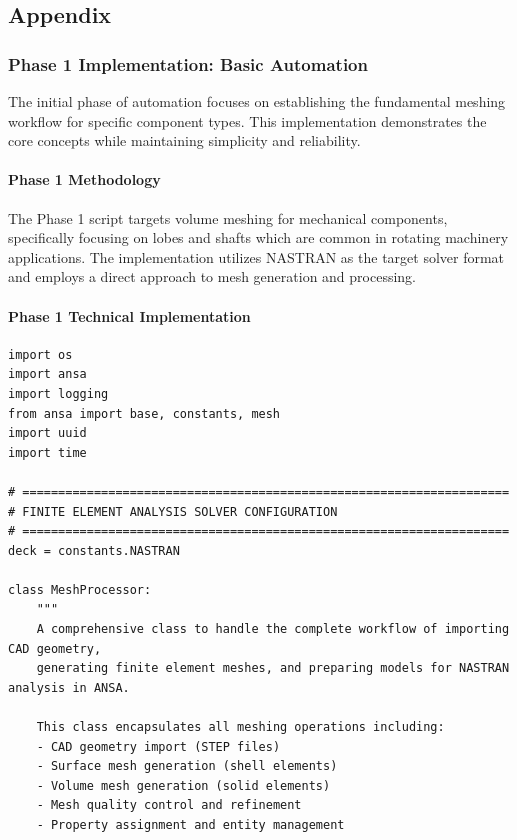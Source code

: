 \documentclass{book}
\begin{document}
\begin{itemize}[leftmargin=*,label=\textbullet]
\begin{itemize}
\newpage
\part{Appendix}
\section{Phase 1 Implementation: Basic Automation}

The initial phase of automation focuses on establishing the fundamental meshing workflow for specific component types. This implementation demonstrates the core concepts while maintaining simplicity and reliability.

\subsection{Phase 1 Methodology}

The Phase 1 script targets volume meshing for mechanical components, specifically focusing on lobes and shafts which are common in rotating machinery applications. The implementation utilizes NASTRAN as the target solver format and employs a direct approach to mesh generation and processing.

\subsection{Phase 1 Technical Implementation}

\begin{lstlisting}[caption={Phase 1 Meshing Automation Script},label={lst:phase1}]
import os
import ansa
import logging
from ansa import base, constants, mesh
import uuid
import time

# ====================================================================
# FINITE ELEMENT ANALYSIS SOLVER CONFIGURATION
# ====================================================================
deck = constants.NASTRAN

class MeshProcessor:
    """
    A comprehensive class to handle the complete workflow of importing CAD geometry,
    generating finite element meshes, and preparing models for NASTRAN analysis in ANSA.
    
    This class encapsulates all meshing operations including:
    - CAD geometry import (STEP files)
    - Surface mesh generation (shell elements)
    - Volume mesh generation (solid elements)
    - Mesh quality control and refinement
    - Property assignment and entity management
    

\end{lstlisting}
\end{itemize}
\end{itemize}
\end{document}
